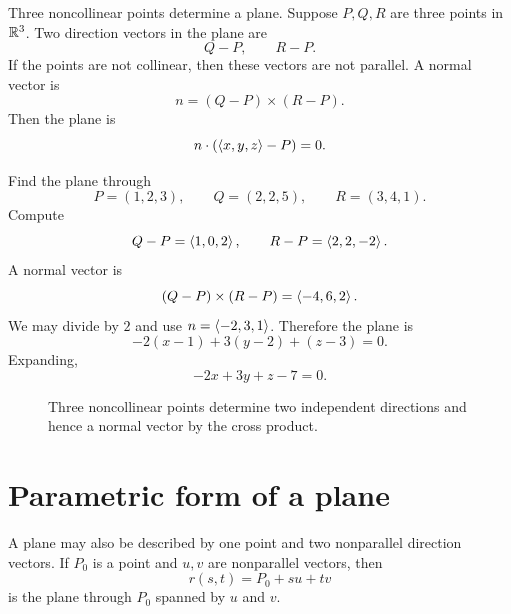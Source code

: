 Three noncollinear points determine a plane. Suppose $P,Q,R$ are three points in $\mathbb{R}^3$. Two direction vectors in the plane are
\[
  Q-P,\qquad R-P.
\]
If the points are not collinear, then these vectors are not parallel. A normal vector is
\[
  n=(Q-P)\times(R-P).
\]
Then the plane is
\[
  n\cdot(\left\langle x,y,z\right\rangle-P)=0.
\]

\begin{examplebox}[title={Example 4.5: Plane through three points}]
Find the plane through
\[
  P=(1,2,3),\qquad Q=(2,2,5),\qquad R=(3,4,1).
\]
Compute
\[
  Q-P=\left\langle 1,0,2\right\rangle,\qquad R-P=\left\langle 2,2,-2\right\rangle.
\]
A normal vector is
\[
  (Q-P)\times(R-P)=\left\langle -4,6,2\right\rangle.
\]
We may divide by $2$ and use $n=\left\langle -2,3,1\right\rangle$. Therefore the plane is
\[
  -2(x-1)+3(y-2)+(z-3)=0.
\]
Expanding,
\[
  -2x+3y+z-7=0.
\]
\end{examplebox}

\begin{figure}[H]
\centering
{}
\caption{Three noncollinear points determine two independent directions and hence a normal vector by the cross product.}
\end{figure}

\section{Parametric form of a plane}

A plane may also be described by one point and two nonparallel direction vectors. If $P_0$ is a point and $u,v$ are nonparallel vectors, then
\[
  r(s,t)=P_0+su+tv
\]
is the plane through $P_0$ spanned by $u$ and $v$.

